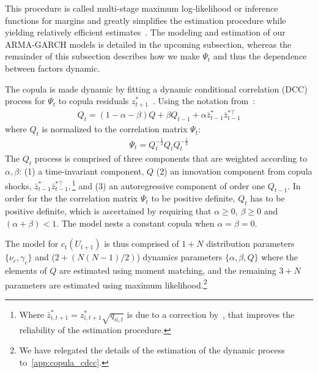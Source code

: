 This procedure is called multi-stage maximum log-likelihood or inference functions for margins and greatly simplifies the estimation procedure while yielding relatively efficient estimates~\autocite{Patton2006,Joe1997}. The modeling and estimation of our ARMA-GARCH models is detailed in the upcoming subsection, whereas the remainder of this subsection describes how we make $\Psi_t$ and thus the dependence between factors dynamic.

The copula is made dynamic by fitting a dynamic conditional correlation (DCC) process for $\Psi_t$ to copula residuals $z_{t+1}^*$~\autocite{Engle2002}. Using the notation from~\textcite{ChristoffersenLanglois2013}:
\begin{align}
  Q_t = (1 - \alpha - \beta) Q
    + \beta Q_{t-1}
    + \alpha \bar{z}_{t-1}^* \bar{z}_{t-1}^{*\top}
  \label{eq:copula_cdcc}
\end{align}
where $Q_t$ is normalized to the correlation matrix $\Psi_t$:
\begin{align}
  \Psi_t = Q_t^{-\frac{1}{2}} Q_t Q_t^{-\frac{1}{2}}
  \label{eq:copula_cdcc_psi}
\end{align}
The $Q_t$ process is comprised of three components that are weighted according to $\alpha, \beta$: (1) a time-invariant component, $Q$ (2) an innovation component from copula shocks, $\bar{z}_{t-1}^{*} \bar{z}_{t-1}^{*\top},$\footnote{Where $\bar{z}_{i,t+1}^* = z_{i,t+1}^* \sqrt{q_{ii,t}}$ is due to a correction by~\textcite{Aielli2013}, that improves the reliability of the estimation procedure.} and (3) an autoregressive component of order one $Q_{t-1}$. In order for the the correlation matrix $\Psi_t$ to be positive definite, $Q_t$ has to be positive definite, which is ascertained by requiring that $\alpha \geq 0$, $\beta \geq 0$ and $(\alpha + \beta) < 1$. The model nests a constant copula when $\alpha = \beta = 0$.

The model for $c_t(U_{t+1})$ is thus comprised of $1 + N$ distribution parameters $\{\nu_c, \gamma_c\}$ and ($2 + (N(N-1) / 2)$) dynamics parameters $\{\alpha, \beta, Q\}$ where the elements of $Q$ are estimated using moment matching, and the remaining $3 + N$ parameters are estimated using maximum likelihood.\footnote{We have relegated the details of the estimation of the dynamic process to~\autoref{app:copula_cdcc}.}

